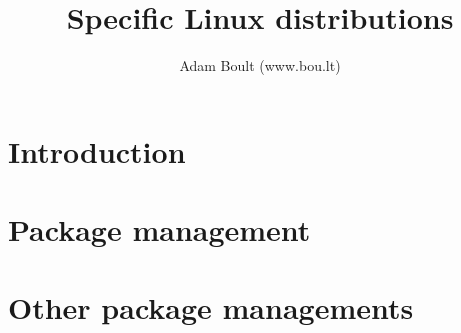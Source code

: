 \documentclass[oneside]{book}
\begin{document}
\author{Adam Boult (www.bou.lt)}
\title{Specific Linux distributions}
\maketitle

\setcounter{tocdepth}{0}
\tableofcontents



\part{Introduction}


\part{Package management}












\part{Other package managements}



\end{document}
